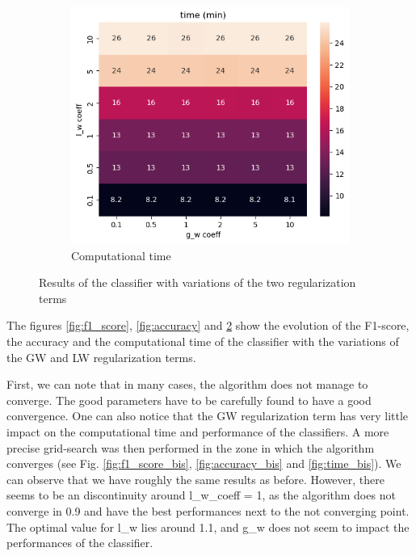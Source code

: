 \documentclass[a4paper,11pt]{article}
\begin{document}
\begin{figure}[h]
\begin{subfigure}{0.32\textwidth}
    \end{subfigure}
    \begin{subfigure}{0.32\textwidth}
        \includegraphics[width=\textwidth]{figures/time_results.png}
        \caption{Computational time}
        \label{fig:time}
    \end{subfigure}
    \caption{Results of the classifier with variations of the two regularization terms}
\end{figure}


The figures \ref{fig:f1_score}, \ref{fig:accuracy} and \ref{fig:time} show the evolution of the F1-score, the accuracy and the computational time of the classifier with the variations of the GW and LW regularization terms.

First, we can note that in many cases, the algorithm does not manage to converge. 
The good parameters have to be carefully found to have a good convergence.
One can also notice that the GW regularization term has very little impact on the computational time and performance of the classifiers.
A more precise grid-search was then performed in the zone in which the algorithm converges (see Fig. \ref{fig:f1_score_bis}, \ref{fig:accuracy_bis} and \ref{fig:time_bis}).
We can observe that we have roughly the same results as before. 
However, there seems to be an discontinuity around l\_w\_coeff = 1, as the algorithm does not converge in 0.9 and have the best performances next to the not converging point. \\
The optimal value for l\_w lies around 1.1, and g\_w does not seem to impact the performances of the classifier.
\end{document}

